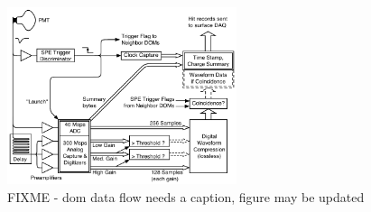 \begin{figure}[h]
 \centering
 \includegraphics[width=0.6\textwidth]{graphics/dom/functional/domfig3-DOMDataFlow.pdf}
 \caption{FIXME - dom data flow needs a caption, figure may be updated}
 \label{fig:domdataflow}
\end{figure}




